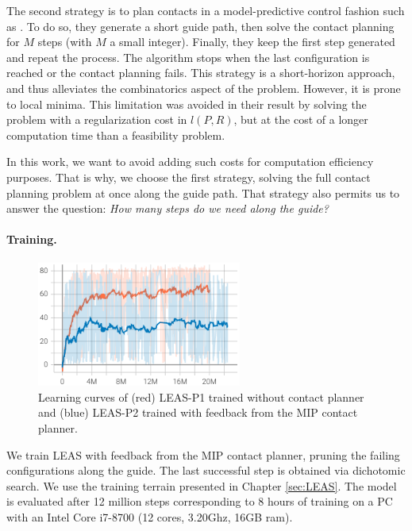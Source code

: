 The second strategy is to plan contacts in a model-predictive control fashion such as \cite{fanny_mip_solo}. 
To do so, they generate a short guide path, then solve the contact planning for $M$ steps (with $M$ a small integer).
Finally, they keep the first step generated and repeat the process.
The algorithm stops when the last configuration is reached or the contact planning fails.
This strategy is a short-horizon approach, and thus alleviates the combinatorics aspect of the problem. 
However, it is prone to local minima.
This limitation was avoided in their result by solving the problem with a regularization cost in $l(P,R)$, but at the cost of a longer computation time than a feasibility problem.

In this work, we want to avoid adding such costs for computation efficiency purposes. 
That is why, we choose the first strategy, solving the full contact planning problem at once along the guide path.
That strategy also permits us to answer the question: \textit{How many steps do we need along the guide?}


\paragraph{Training.}
\begin{figure}[t]
    \centering
    \includegraphics[trim={0 0 0 0},clip,width=0.6\textwidth]{Figures/Chapter_MIP_SL1M/learning_curve_MIP_P1.png}
    \caption{Learning curves of (red) LEAS-P1 trained without contact planner and (blue) LEAS-P2 trained with feedback from the MIP contact planner.}
    \label{fig:mip:learning_curves}
\end{figure}
We train LEAS with feedback from the MIP contact planner, pruning the failing configurations along the guide.
The last successful step is obtained via dichotomic search.
We use the training terrain presented in Chapter \ref{sec:LEAS}.
The model is evaluated after 12 million steps corresponding to 8 hours of training on a PC with an Intel Core i7-8700 (12 cores, 3.20Ghz, 16GB ram). 

